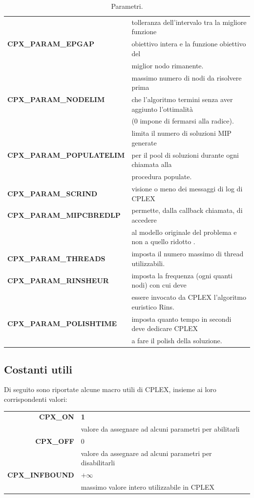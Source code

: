 \begin{center}
\begin{center}
\begin{table}[h]
\centering\footnotesize
\begin{tabular}{|l|l|}
\hline
\multirow{3}{*}{\textbf{CPX\_PARAM\_EPGAP}} & {tolleranza dell'intervalo tra la migliore funzione }\\
& {obiettivo intera e la funzione obiettivo del}\\
& {miglior nodo rimanente.}\\
\hline
\multirow{3}{*}{\textbf{CPX\_PARAM\_NODELIM}} & {massimo numero di nodi da risolvere prima}\\
& {che l'algoritmo termini senza aver aggiunto l'ottimalità}\\
& {(0 impone di fermarsi alla radice).}\\
\hline
\multirow{3}{*}{\textbf{CPX\_PARAM\_POPULATELIM}} & {limita il numero di soluzioni MIP generate }\\
& {per il pool di soluzioni durante ogni chiamata alla}\\
&{procedura populate.}\\
\hline
\textbf{CPX\_PARAM\_SCRIND} & {visione o meno dei messaggi di log di CPLEX}\\
\hline
\textbf{CPX\_PARAM\_MIPCBREDLP} & {permette, dalla callback chiamata, di accedere  }\\
&{al modello originale del problema e non a quello ridotto .}\\
\hline
\textbf{CPX\_PARAM\_THREADS} & {imposta il numero massimo di thread utilizzabili. }\\
\hline
\textbf{CPX\_PARAM\_RINSHEUR} & {imposta la frequenza (ogni quanti nodi) con cui deve}\\
&{essere invocato da CPLEX l'algoritmo euristico Rins.}\\
\hline
\textbf{CPX\_PARAM\_POLISHTIME} & {imposta quanto tempo in secondi deve dedicare CPLEX}\\
&{a fare il polish della soluzione.}\\
\hline
\end{tabular}
\caption{Parametri.}\label{param_table}
\end{table}
\subsection{Costanti utili}
Di seguito sono riportate alcune macro utili di CPLEX, insieme ai loro corrispondenti valori:
\begin{table}[h]
\footnotesize\centering
\begin{tabular}{|r|l|}
\hline
\textbf{CPX\_ON} & {\textbf{1}}\\
{} & {valore da assegnare ad alcuni parametri per abilitarli}\\
\hline
\textbf{CPX\_OFF} & {0}\\
{} & {valore da assegnare ad alcuni parametri per disabilitarli}\\
\hline
\textbf{CPX\_INFBOUND} & {$+\infty$}\\
{} & {massimo valore intero utilizzabile in CPLEX}\\
\hline
\end{tabular}
\end{table}


\end{center}
\end{center}
